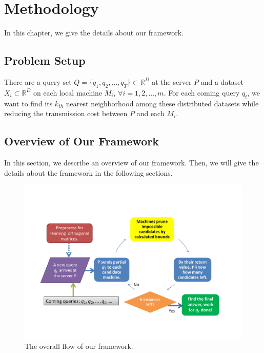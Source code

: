 \chapter{Methodology}
\label{c:method}
In this chapter, we give the details about our framework.

\section{Problem Setup}
\label{s:probsetup}
There are a query set $Q={\{q_1,q_2,...,q_T\}}\subset\mathbb{R}^D$ at the server $P$ and a dataset $X_i\subset\mathbb{R}^D$ on each local machine $M_i$, $\forall i=1,2,...,m$.  For each coming query $q_t$, we want to find its $k_{th}$ nearest neighborhood among these distributed datasets while reducing the transmission cost between $P$ and each $M_i$.

\section{Overview of Our Framework}
\label{s:overview}
In this section, we describe an overview of our framework.  Then, we will give the details about the framework in the following sections.

\begin{figure}[htpb!]
  \centering
    \includegraphics[width=1.0\textwidth]{fig/flow.jpg}
    \caption{\label{fig:overallflow}The overall flow of our framework.}
\end{figure}

